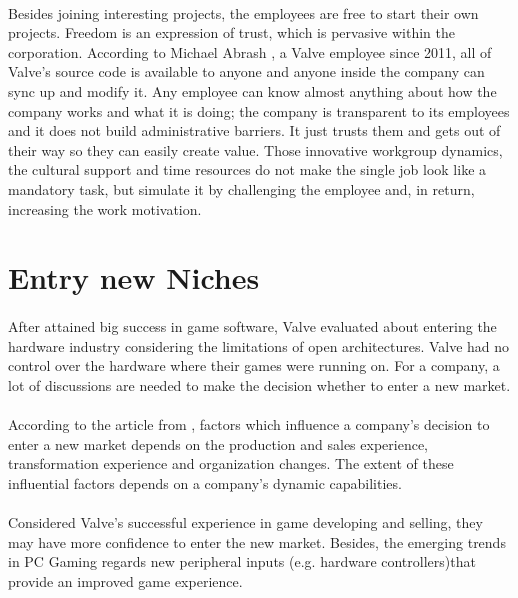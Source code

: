 \documentclass[12pt,twoside,notitle,a4paper]{article}
\begin{document}
\paragraph{}Besides joining interesting projects, the employees are free to start their own projects. Freedom is an expression of trust, which is pervasive within the corporation. According to Michael Abrash \citep*{valveBlog}, a Valve employee since 2011, all of Valve’s source code is available to anyone and anyone inside the company can sync up and modify it. Any employee can know almost anything about how the company works and what it is doing; the company is transparent to its employees and it does not build administrative barriers. It just trusts them and gets out of their way so they can easily create value. Those innovative workgroup dynamics, the cultural support and time resources do not make the single job look like a mandatory task, but simulate it by challenging the employee and, in return, increasing the work motivation.

\section{Entry new Niches}

\paragraph{}After attained big success in game software, Valve evaluated about entering the hardware industry considering the limitations of open architectures. Valve had no control over the hardware where their games were running on. For a company, a lot of discussions are needed  to make the decision whether to enter a new market. 
 \paragraph{}According to the article from \citep*{king2002incumbent}, factors which influence a company’s decision to enter a new market depends on the production and sales experience, transformation experience and organization changes. The extent of these influential factors depends on a company’s dynamic capabilities. 
\paragraph{}Considered Valve's successful experience in game developing and selling, they may have more confidence to enter the new market. Besides, the emerging trends in PC Gaming regards new peripheral inputs (e.g. hardware controllers)that provide an improved game experience. 
\end{document}
